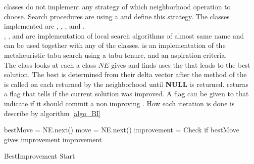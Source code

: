  classes do not implement any strategy of which neighborhood operation to choose. 
Search procedures are using a  and define this strategy. The classes implemented 
are , , , and . \\
, , and  are implementation of local search 
algorithms of almost same name and can be used together with any of the  classes. 
 is an implementation of the metaheuristic tabu search using a tabu tenure, and 
an aspiration criteria. \medskip \\
The class  looks at each  a  class $NE$ gives and finds uses the 
 that leads to the best solution. The best  is determined from their delta vector after the 
method  of the  is called on each  returned by the 
neighborhood until \textbf{NULL} is returned.  returns a flag that tells if the current 
solution was improved. A flag can be given to  that indicate if it should commit a non 
improving . How each iteration is done is describe by algorithm \ref{algo_BI} \\ 
\IncMargin{1em}
\begin{algorithm}[H]

\algdata
{}
\BlankLine
 bestMove = NE.next() \;
 move = NE.next() \;
\bool improvement = Check if bestMove gives improvement \;
 \;
\Return improvement \;

\caption{BestImprovement Start} \label{algo_BI} 
\end{algorithm} \noindent
